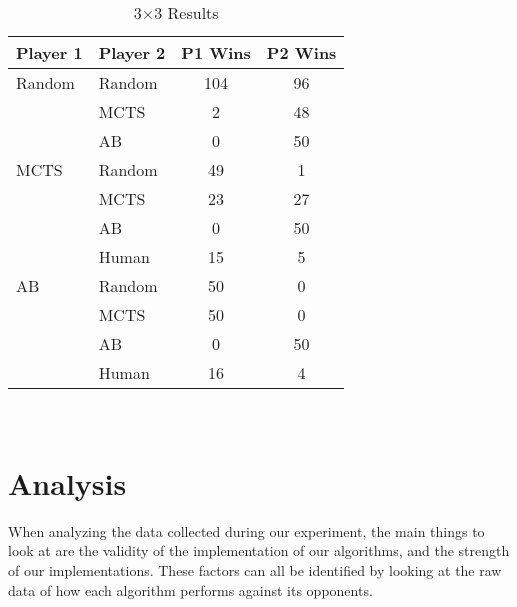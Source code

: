 \documentclass[12pt]{article}
\begin{document}
    \begin{table}[htb]
        \begin{center}
            \caption{3\(\times\)3 Results}
            \begin{tabular}{llcc}
                \toprule
                Player 1 & Player 2 & P1 Wins & P2 Wins \\
                \toprule
                Random & Random & 104 & 96\\
                & MCTS & 2 & 48\\
                & AB & 0 & 50\\
                \midrule
                MCTS & Random & 49 & 1\\
                 & MCTS & 23 & 27\\
                 & AB & 0 & 50\\
                 & Human & 15 & 5\\
                \midrule
                AB & Random & 50 & 0\\
                 & MCTS & 50 & 0\\
                 & AB & 0 & 50\\
                 & Human & 16 & 4\\
            \end{tabular} \\
        \end{center}
    \end{table}

    \section{Analysis}
    When analyzing the data collected during our experiment, the main things to look at are the validity of the implementation of our algorithms, and the strength of our implementations. These factors can all be identified by looking at the raw data of how each algorithm performs against its opponents. 
\end{document}
